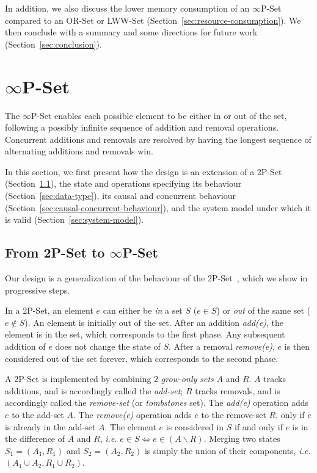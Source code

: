 \documentclass[11pt, oneside]{article}   	%
\begin{document}
In addition, we also discuss the lower memory consumption of an $\infty$P-Set compared to an OR-Set or LWW-Set (Section~\ref{sec:resource-consumption}). We then conclude with a summary and some directions for future work (Section~\ref{sec:conclusion}).

\section{$\infty$P-Set}
\label{sec:specification}

The $\infty$P-Set enables each possible element to be either in or out of the set, following a possibly infinite sequence of addition and removal operations. Concurrent additions and removals are resolved by having the longest sequence of alternating additions and removals win. 

In this section, we first present how the design is an extension of a 2P-Set (Section~\ref{sec:intuition}), the state and operations specifying its behaviour (Section~\ref{sec:data-type}), its causal and concurrent behaviour (Section~\ref{sec:causal-concurrent-behaviour}), and the system model under which it is valid (Section~\ref{sec:system-model}).

\subsection{From 2P-Set to $\infty$P-Set}
\label{sec:intuition}

Our design is a generalization of the behaviour of the 2P-Set~\cite{shapiro:inria-00555588}, which we show in progressive steps. 

In a 2P-Set, an element $e$ can either be \textit{in} a set $S$ ($e \in S$) or \textit{out} of the same set ($e \notin S$). An element is initially out of the set. After an addition \textit{add(e)}, the element is in the set, which corresponds to the first phase. Any subsequent addition of $e$ does not change the state of $S$. After a removal \textit{remove(e)}, $e$ is then considered out of the set forever, which corresponds to the second phase.

A 2P-Set is implemented by combining 2 \textit{grow-only sets} $A$ and $R$. $A$ tracks additions, and is accordingly called the \textit{add-set}; $R$ tracks removals, and is accordingly called the \textit{remove-set} (or \textit{tombstones} set). The \textit{add(e)} operation adds $e$ to the add-set $A$. The \textit{remove(e)} operation adds $e$ to the remove-set $R$, only if $e$ is already in the add-set $A$. The element $e$ is considered in $S$ if and only if $e$ is in the difference of $A$ and $R$, \textit{i.e.} $e \in S \Leftrightarrow e \in (A\backslash R)$. Merging two states $S_1 = (A_1, R_1)$ and $S_2 = (A_2, R_2)$ is simply the union of their components, \textit{i.e.} $(A_1 \cup A_2, R_1 \cup R_2)$.
\end{document}
